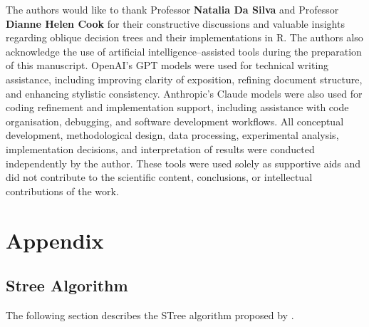 The authors would like to thank Professor \textbf{Natalia Da Silva} and Professor \textbf{Dianne Helen Cook} for their constructive discussions and valuable insights regarding oblique decision trees and their implementations in R. The authors also acknowledge the use of artificial intelligence--assisted tools during the preparation of this manuscript. OpenAI's GPT models \citep{OpenAI2026} were used for technical writing assistance, including improving clarity of exposition, refining document structure, and enhancing stylistic consistency. Anthropic's Claude models \citep{anthropic2026claude} were also used for coding refinement and implementation support, including assistance with code organisation, debugging, and software development workflows. All conceptual development, methodological design, data processing, experimental analysis, implementation decisions, and interpretation of results were conducted independently by the author. These tools were used solely as supportive aids and did not contribute to the scientific content, conclusions, or intellectual contributions of the work.

\newpage

\section{Appendix}\label{appendix}

\subsection{Stree Algorithm}\label{stree-algorithm}

The following section describes the STree algorithm proposed by \citet{Montanana2021}.

